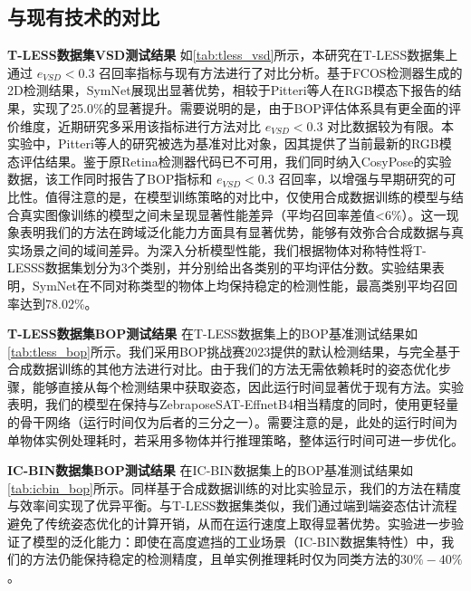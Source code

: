 \subsection{与现有技术的对比}

\textbf{T-LESS数据集VSD测试结果 } 如\autoref{tab:tless_vsd}所示，本研究在T-LESS数据集上通过 $e_{VSD}<0.3$ 召回率指标与现有方法进行了对比分析。基于FCOS\cite{fcos}检测器生成的2D检测结果，SymNet展现出显著优势，相较于Pitteri等人\cite{pitteri2019object}在RGB模态下报告的结果，实现了25.0\%的显著提升。需要说明的是，由于BOP评估体系具有更全面的评价维度，近期研究多采用该指标进行方法对比 $e_{VSD}<0.3$ 对比数据较为有限。本实验中，Pitteri等人的研究被选为基准对比对象，因其提供了当前最新的RGB模态评估结果。鉴于原Retina检测器代码已不可用，我们同时纳入CosyPose\cite{labbe2020cosypose}的实验数据，该工作同时报告了BOP指标和 $e_{VSD}<0.3$ 召回率，以增强与早期研究的可比性。值得注意的是，在模型训练策略的对比中，仅使用合成数据训练的模型与结合真实图像训练的模型之间未呈现显著性能差异（平均召回率差值<6\%）。这一现象表明我们的方法在跨域泛化能力方面具有显著优势，能够有效弥合合成数据与真实场景之间的域间差异。为深入分析模型性能，我们根据物体对称特性将T-LESSS数据集划分为3个类别，并分别给出各类别的平均评估分数。实验结果表明，SymNet在不同对称类型的物体上均保持稳定的检测性能，最高类别平均召回率达到78.02\%。



\textbf{T-LESS数据集BOP测试结果 } 在T-LESS数据集上的BOP基准测试结果如\autoref{tab:tless_bop}所示。我们采用BOP挑战赛2023\cite{hodan2024bop}提供的默认检测结果，与完全基于合成数据训练的其他方法进行对比。由于我们的方法无需依赖耗时的姿态优化步骤，能够直接从每个检测结果中获取姿态，因此运行时间显著优于现有方法。实验表明，我们的模型在保持与ZebraposeSAT-EffnetB4相当精度的同时，使用更轻量的骨干网络（运行时间仅为后者的三分之一）。需要注意的是，此处的运行时间为单物体实例处理耗时，若采用多物体并行推理策略，整体运行时间可进一步优化。



\textbf{IC-BIN数据集BOP测试结果 } 在IC-BIN数据集上的BOP基准测试结果如\autoref{tab:icbin_bop}所示。同样基于合成数据训练的对比实验显示，我们的方法在精度与效率间实现了优异平衡。与T-LESS数据集类似，我们通过端到端姿态估计流程避免了传统姿态优化的计算开销，从而在运行速度上取得显著优势。实验进一步验证了模型的泛化能力：即使在高度遮挡的工业场景（IC-BIN数据集特性）中，我们的方法仍能保持稳定的检测精度，且单实例推理耗时仅为同类方法的$30\%-40\%$。



